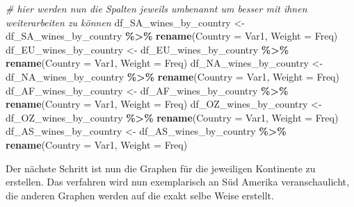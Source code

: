 \documentclass[
]{article}
\newenvironment{Shaded}{\begin{snugshade}}{\end{snugshade}}
\newcommand{\AttributeTok}[1]{\textcolor[rgb]{0.13,0.29,0.53}{#1}}
\newcommand{\CommentTok}[1]{\textcolor[rgb]{0.56,0.35,0.01}{\textit{#1}}}
\newcommand{\FunctionTok}[1]{\textcolor[rgb]{0.13,0.29,0.53}{\textbf{#1}}}
\newcommand{\NormalTok}[1]{#1}
\newcommand{\OtherTok}[1]{\textcolor[rgb]{0.56,0.35,0.01}{#1}}
\newcommand{\SpecialCharTok}[1]{\textcolor[rgb]{0.81,0.36,0.00}{\textbf{#1}}}
\begin{document}
\begin{Shaded}
\begin{Highlighting}[]
\CommentTok{\# hier werden nun die Spalten jeweils umbenannt um besser mit ihnen weiterarbeiten zu können }
\NormalTok{df\_SA\_wines\_by\_country }\OtherTok{\textless{}{-}}\NormalTok{ df\_SA\_wines\_by\_country }\SpecialCharTok{\%\textgreater{}\%} \FunctionTok{rename}\NormalTok{(}\AttributeTok{Country =}\NormalTok{ Var1, }\AttributeTok{Weight =}\NormalTok{ Freq)}
\NormalTok{df\_EU\_wines\_by\_country }\OtherTok{\textless{}{-}}\NormalTok{ df\_EU\_wines\_by\_country }\SpecialCharTok{\%\textgreater{}\%} \FunctionTok{rename}\NormalTok{(}\AttributeTok{Country =}\NormalTok{ Var1, }\AttributeTok{Weight =}\NormalTok{ Freq)}
\NormalTok{df\_NA\_wines\_by\_country }\OtherTok{\textless{}{-}}\NormalTok{ df\_NA\_wines\_by\_country }\SpecialCharTok{\%\textgreater{}\%} \FunctionTok{rename}\NormalTok{(}\AttributeTok{Country =}\NormalTok{ Var1, }\AttributeTok{Weight =}\NormalTok{ Freq)}
\NormalTok{df\_AF\_wines\_by\_country }\OtherTok{\textless{}{-}}\NormalTok{ df\_AF\_wines\_by\_country }\SpecialCharTok{\%\textgreater{}\%} \FunctionTok{rename}\NormalTok{(}\AttributeTok{Country =}\NormalTok{ Var1, }\AttributeTok{Weight =}\NormalTok{ Freq)}
\NormalTok{df\_OZ\_wines\_by\_country }\OtherTok{\textless{}{-}}\NormalTok{ df\_OZ\_wines\_by\_country }\SpecialCharTok{\%\textgreater{}\%} \FunctionTok{rename}\NormalTok{(}\AttributeTok{Country =}\NormalTok{ Var1, }\AttributeTok{Weight =}\NormalTok{ Freq)}
\NormalTok{df\_AS\_wines\_by\_country }\OtherTok{\textless{}{-}}\NormalTok{ df\_AS\_wines\_by\_country }\SpecialCharTok{\%\textgreater{}\%} \FunctionTok{rename}\NormalTok{(}\AttributeTok{Country =}\NormalTok{ Var1, }\AttributeTok{Weight =}\NormalTok{ Freq)}
\end{Highlighting}
\end{Shaded}

Der nächste Schritt ist nun die Graphen für die jeweiligen Kontinente zu
erstellen. Das verfahren wird nun exemplarisch an Süd Amerika
veranschaulicht, die anderen Graphen werden auf die exakt selbe Weise
erstellt.
\end{document}

